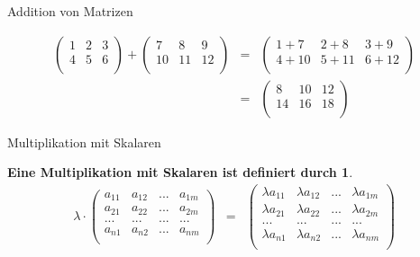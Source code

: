 \documentclass[german]{beamer}
\newcommand{\bq}{\begin{eqnarray*}}
\newcommand{\eq}{\end{eqnarray*}}
\newtheorem*{mytheorem14}{Eine Multiplikation mit Skalaren ist definiert durch}
\begin{document}
\begin{frame}{Addition von Matrizen}

\begin{example}
\bq
\left( \begin{array}{ccc}
 1 & 2 & 3 \\
 4 & 5 & 6 \\
\end{array} \right)
 +
\left( \begin{array}{ccc}
 7 & 8 & 9 \\
 10 & 11 & 12 \\
\end{array} \right)
 & = &
\left( \begin{array}{ccc}
 1+7 & 2+8 & 3+9 \\
 4+10 & 5+11 & 6+12 \\
\end{array} \right)
 \nonumber \\
 & = &
\left( \begin{array}{ccc}
 8 & 10 & 12 \\
 14 & 16 & 18 \\
\end{array} \right)
\eq
\end{example}

\end{frame}

\begin{frame}{Multiplikation mit Skalaren}

\begin{mytheorem14}
{\small
\bq
\lambda \cdot
\left( \begin{array}{cccc}
 a_{11} & a_{12} & ... & a_{1m} \\
 a_{21} & a_{22} & ... & a_{2m} \\
 ...    & ...    & ... & ...    \\
 a_{n1} & a_{n2} & ... & a_{nm} \\
\end{array} \right)
& = & 
\left( \begin{array}{cccc}
 \lambda a_{11} & \lambda a_{12} & ... & \lambda a_{1m} \\
 \lambda a_{21} & \lambda a_{22} & ... & \lambda a_{2m} \\
 ...    & ...    & ... & ...    \\
 \lambda a_{n1} & \lambda a_{n2} & ... & \lambda a_{nm} \\
\end{array} \right)
\eq
}
\end{mytheorem14}

\end{frame}
\end{document}
